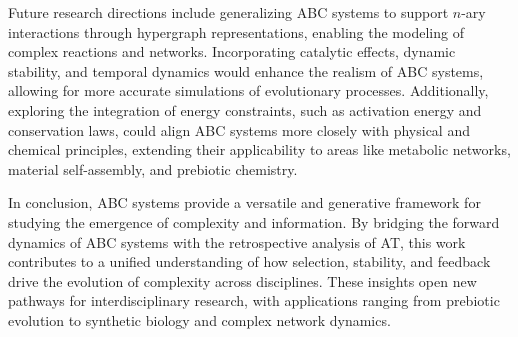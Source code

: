 \documentclass[entropy,article,submit,pdftex,oneauthor]{Definitions/mdpi}
\begin{document}
Future research directions include generalizing ABC systems to support \( n \)-ary interactions through hypergraph representations, enabling the modeling of complex reactions and networks. Incorporating catalytic effects, dynamic stability, and temporal dynamics would enhance the realism of ABC systems, allowing for more accurate simulations of evolutionary processes. Additionally, exploring the integration of energy constraints, such as activation energy and conservation laws, could align ABC systems more closely with physical and chemical principles, extending their applicability to areas like metabolic networks, material self-assembly, and prebiotic chemistry.

In conclusion, ABC systems provide a versatile and generative framework for studying the emergence of complexity and information. By bridging the forward dynamics of ABC systems with the retrospective analysis of AT, this work contributes to a unified understanding of how selection, stability, and feedback drive the evolution of complexity across disciplines. These insights open new pathways for interdisciplinary research, with applications ranging from prebiotic evolution to synthetic biology and complex network dynamics.
\end{document}
